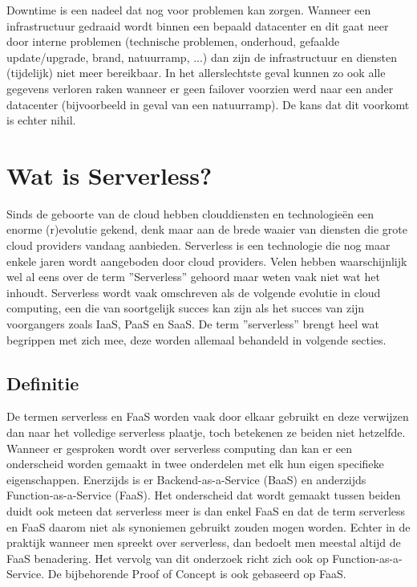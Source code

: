 \begin{description}[style=unboxed, labelwidth=\linewidth, listparindent =0pt]
        \item [Downtime]
        Downtime is een nadeel dat nog voor problemen kan zorgen. Wanneer een infrastructuur gedraaid wordt binnen een bepaald datacenter en dit gaat neer door interne problemen (technische problemen, onderhoud, gefaalde update/upgrade, brand, natuurramp, ...) dan zijn de infrastructuur en diensten (tijdelijk) niet meer bereikbaar. In het allerslechtste geval kunnen zo ook alle gegevens verloren raken wanneer er geen failover voorzien werd naar een ander datacenter (bijvoorbeeld in geval van een natuurramp). De kans dat dit voorkomt is echter nihil.
\end{description}
\newpage

\section{Wat is Serverless?}
\label{sec:wat-is-serverless}
Sinds de geboorte van de cloud hebben clouddiensten en technologieën een enorme (r)evolutie gekend, denk maar aan de brede waaier van diensten die grote cloud providers vandaag aanbieden. Serverless  is een technologie die nog maar enkele jaren wordt aangeboden door cloud providers. Velen hebben waarschijnlijk wel al eens over de term ''Serverless'' gehoord maar weten vaak niet wat het inhoudt. Serverless wordt vaak omschreven als de volgende evolutie in cloud computing, een die van soortgelijk succes kan zijn als het succes van zijn voorgangers zoals IaaS, PaaS en SaaS. De term ''serverless'' brengt heel wat begrippen met zich mee, deze worden allemaal behandeld in volgende secties.
 
\subsection{Definitie}
De termen serverless en FaaS worden vaak door elkaar gebruikt en deze verwijzen dan naar het volledige serverless plaatje, toch betekenen ze beiden niet hetzelfde. Wanneer er gesproken wordt over serverless computing dan kan er een onderscheid worden gemaakt in twee onderdelen met elk hun eigen specifieke eigenschappen. Enerzijds is er Backend-as-a-Service (BaaS) en anderzijds Function-as-a-Service (FaaS). Het onderscheid dat wordt gemaakt tussen beiden duidt ook meteen dat serverless meer is dan enkel FaaS en dat de term serverless en FaaS daarom niet als synoniemen gebruikt zouden mogen worden. Echter in de praktijk wanneer men spreekt over serverless, dan bedoelt men meestal altijd de FaaS benadering. Het vervolg van dit onderzoek richt zich ook op Function-as-a-Service. De bijbehorende Proof of Concept is ook gebaseerd op FaaS. \autocite{Roberts2017}

